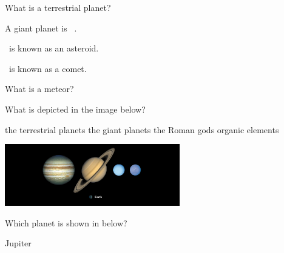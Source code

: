 \documentclass[addpoints]{exam}
\begin{document}
\begin{questions}


\question
What is a terrestrial planet?

\question
A giant planet is \fillin\ .

\question
\fillin\ is known as an asteroid.

\question
\fillin\ is known as a comet.

\question
What is a meteor?

\question
What is depicted in the image below?
\vspace{1em}

\begin{minipage}{0.3\textwidth}
    \centering
    \begin{choices}
    \choice the terrestrial planets
    \correctchoice the giant planets 
    \choice the Roman gods
    \choice organic elements
    \end{choices}
\end{minipage}%
\begin{minipage}{0.5\textwidth}
    \centering
    \includegraphics[width=3in]{Figures/Figure7.5.jpg}
\end{minipage}
\vspace{1em}

\question
Which planet is shown in below?
\vspace{1em}

\begin{minipage}{0.3\textwidth}
    \centering
    \begin{choices}
    \correctchoice Jupiter 
    \choice 
    \choice 
    \choice 
    \end{choices}
\end{minipage}%
\begin{minipage}{0.5\textwidth}
    \centering
\end{minipage}
\vspace{1em}


\end{questions}
\end{document}
